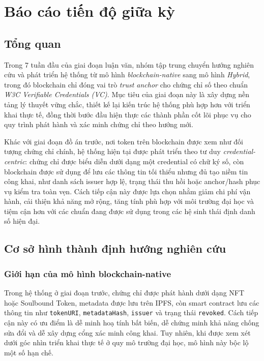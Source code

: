 \chapter{Báo cáo tiến độ giữa kỳ}

\section{Tổng quan}

Trong 7 tuần đầu của giai đoạn luận văn, nhóm tập trung chuyển hướng nghiên cứu và phát triển hệ thống từ mô hình \textit{blockchain-native} sang mô hình \textit{Hybrid}, trong đó blockchain chỉ đóng vai trò \textit{trust anchor} cho chứng chỉ số theo chuẩn \textit{W3C Verifiable Credentials (VC)}. Mục tiêu của giai đoạn này là xây dựng nền tảng lý thuyết vững chắc, thiết kế lại kiến trúc hệ thống phù hợp hơn với triển khai thực tế, đồng thời bước đầu hiện thực các thành phần cốt lõi phục vụ cho quy trình phát hành và xác minh chứng chỉ theo hướng mới.

Khác với giai đoạn đồ án trước, nơi token trên blockchain được xem như đối tượng chứng chỉ chính, hệ thống hiện tại được phát triển theo tư duy \textit{credential-centric}: chứng chỉ được biểu diễn dưới dạng một credential có chữ ký số, còn blockchain được sử dụng để lưu các thông tin tối thiểu nhưng đủ tạo niềm tin công khai, như danh sách issuer hợp lệ, trạng thái thu hồi hoặc anchor/hash phục vụ kiểm tra toàn vẹn. Cách tiếp cận này được lựa chọn nhằm giảm chi phí vận hành, cải thiện khả năng mở rộng, tăng tính phù hợp với môi trường đại học và tiệm cận hơn với các chuẩn đang được sử dụng trong các hệ sinh thái định danh số hiện đại.

\section{Cơ sở hình thành định hướng nghiên cứu}

\subsection{Giới hạn của mô hình blockchain-native}

Trong hệ thống ở giai đoạn trước, chứng chỉ được phát hành dưới dạng NFT hoặc Soulbound Token, metadata được lưu trên IPFS, còn smart contract lưu các thông tin như \texttt{tokenURI}, \texttt{metadataHash}, \texttt{issuer} và trạng thái \texttt{revoked}. Cách tiếp cận này có ưu điểm là dễ minh hoạ tính bất biến, dễ chứng minh khả năng chống sửa đổi và dễ xây dựng cổng xác minh công khai. Tuy nhiên, khi được xem xét dưới góc nhìn triển khai thực tế ở quy mô trường đại học, mô hình này bộc lộ một số hạn chế.

